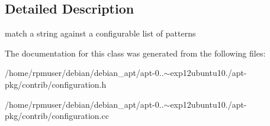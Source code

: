 \subsection{\-Detailed \-Description}
match a string against a configurable list of patterns 

\-The documentation for this class was generated from the following files\-:\begin{DoxyCompactItemize}
\item 
/home/rpmuser/debian/debian\-\_\-apt/apt-\/0..$\sim$exp12ubuntu10./apt-\/pkg/contrib/configuration.\-h\item 
/home/rpmuser/debian/debian\-\_\-apt/apt-\/0..$\sim$exp12ubuntu10./apt-\/pkg/contrib/configuration.\-cc\end{DoxyCompactItemize}
